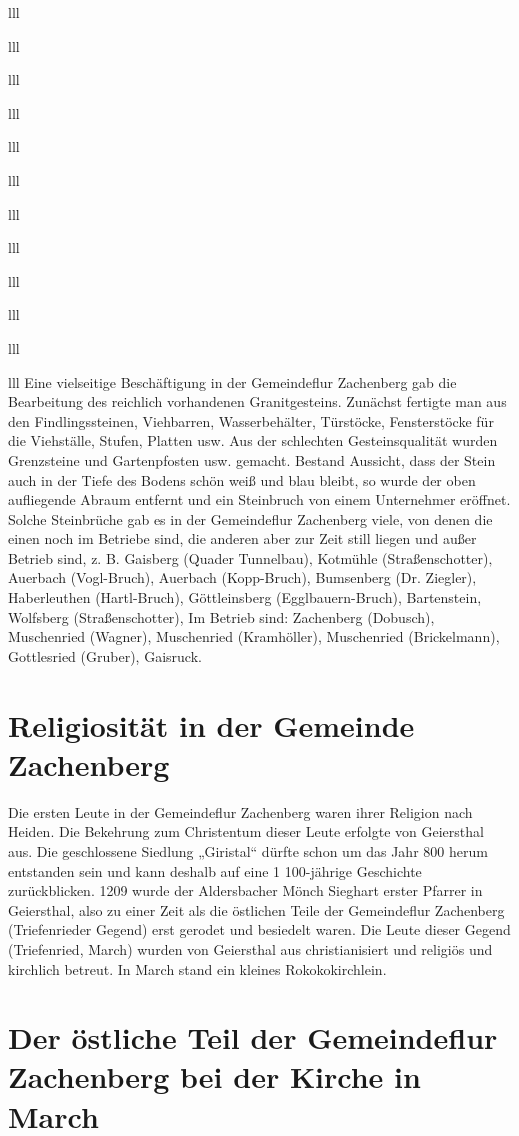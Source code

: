 \documentclass[12pt,a4pager]{book}
\begin{document}
\begin{tabuluar}{lll}
\begin{tabuluar}{lll}
\begin{tabuluar}{lll}
\begin{tabuluar}{lll}
\begin{tabuluar}{lll}
\begin{tabuluar}{lll}
\begin{tabuluar}{lll}
\begin{tabuluar}{lll}
\begin{tabuluar}{lll}
\begin{tabuluar}{lll}
\begin{tabuluar}{lll}
\begin{tabuluar}{lll}
Eine vielseitige Beschäftigung in der Gemeindeflur Zachenberg gab die
Bearbeitung des reichlich vorhandenen Granitgesteins. Zunächst fertigte man aus
den Findlingssteinen, Viehbarren, Wasserbehälter, Türstöcke, Fensterstöcke für
die Viehställe, Stufen, Platten usw. Aus der schlechten Gesteinsqualität wurden
Grenzsteine und Gartenpfosten usw. gemacht. Bestand Aussicht, dass der Stein
auch in der Tiefe des Bodens schön weiß und blau bleibt, so wurde der oben
aufliegende Abraum entfernt und ein Steinbruch von einem Unternehmer eröffnet.
Solche Steinbrüche gab es in der Gemeindeflur Zachenberg viele, von denen die
einen noch im Betriebe sind, die anderen aber zur Zeit still liegen und außer
Betrieb sind, z. B. Gaisberg (Quader Tunnelbau)‚ Kotmühle (Straßenschotter)‚
Auerbach (Vogl-Bruch), Auerbach (Kopp-Bruch), Bumsenberg (Dr. Ziegler),
Haberleuthen (Hartl-Bruch), Göttleinsberg (Egglbauern-Bruch), Bartenstein,
Wolfsberg (Straßenschotter), Im Betrieb sind: Zachenberg (Dobusch), Muschenried
(Wagner), Muschenried (Kramhöller), Muschenried (Brickelmann), Gottlesried
(Gruber), Gaisruck.

\section{Religiosität in der Gemeinde Zachenberg}

Die ersten Leute in der Gemeindeflur Zachenberg waren ihrer Religion nach
Heiden. Die Bekehrung zum Christentum dieser Leute erfolgte von Geiersthal aus.
Die geschlossene Siedlung „Giristal“ dürfte schon um das Jahr 800 herum
entstanden sein und kann deshalb auf eine 1 100-jährige Geschichte
zurückblicken. 1209 wurde der Aldersbacher Mönch Sieghart erster Pfarrer in
Geiersthal, also zu einer Zeit als die östlichen Teile der Gemeindeflur
Zachenberg (Triefenrieder Gegend) erst gerodet und besiedelt waren. Die Leute
dieser Gegend (Triefenried, March) wurden von Geiersthal aus christianisiert und
religiös und kirchlich betreut. In March stand ein kleines Rokokokirchlein.

\section{Der östliche Teil der Gemeindeflur Zachenberg bei der Kirche in March}


\end{tabuluar}
\end{tabuluar}
\end{tabuluar}
\end{tabuluar}
\end{tabuluar}
\end{tabuluar}
\end{tabuluar}
\end{tabuluar}
\end{tabuluar}
\end{tabuluar}
\end{tabuluar}
\end{tabuluar}
\end{document}
